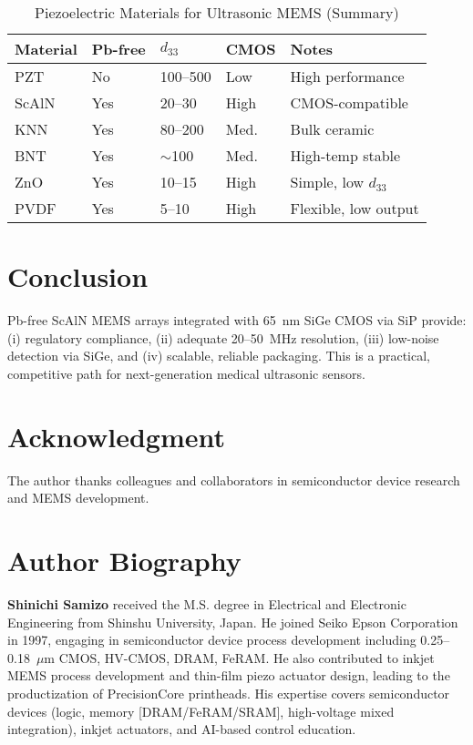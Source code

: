 \documentclass[conference]{IEEEtran}
\begin{document}
\begin{table}[t]
\caption{Piezoelectric Materials for Ultrasonic MEMS (Summary)}
\label{tab:mat}
\centering
\begin{tabular}{@{}lllll@{}}
\toprule
Material & Pb-free & $d_{33}$ & CMOS & Notes\\
\midrule
PZT  & No  & 100--500 & Low  & High performance\\
ScAlN& Yes & 20--30   & High & CMOS-compatible\\
KNN  & Yes & 80--200  & Med. & Bulk ceramic\\
BNT  & Yes & $\sim$100& Med. & High-temp stable\\
ZnO  & Yes & 10--15   & High & Simple, low $d_{33}$\\
PVDF & Yes & 5--10    & High & Flexible, low output\\
\bottomrule
\end{tabular}
\end{table}

\section{Conclusion}
Pb-free ScAlN MEMS arrays integrated with 65~nm SiGe CMOS via SiP provide: (i) regulatory compliance, (ii) adequate 20--50~MHz resolution, (iii) low-noise detection via SiGe, and (iv) scalable, reliable packaging. This is a practical, competitive path for next-generation medical ultrasonic sensors.

\section*{Acknowledgment}
The author thanks colleagues and collaborators in semiconductor device research and MEMS development.




\section*{Author Biography}
\textbf{Shinichi Samizo} received the M.S. degree in Electrical and Electronic Engineering from Shinshu University, Japan. He joined Seiko Epson Corporation in 1997, engaging in semiconductor device process development including 0.25--0.18~$\mu$m CMOS, HV-CMOS, DRAM, FeRAM. He also contributed to inkjet MEMS process development and thin-film piezo actuator design, leading to the productization of PrecisionCore printheads. His expertise covers semiconductor devices (logic, memory [DRAM/FeRAM/SRAM], high-voltage mixed integration), inkjet actuators, and AI-based control education.
\end{document}

